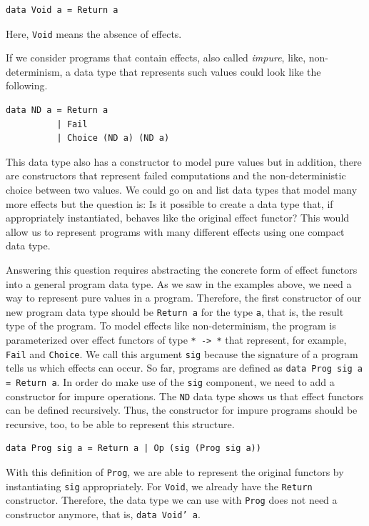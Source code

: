 \documentclass[a4paper, 11pt, fleqn, twoside]{scrreprt}
\newcommand{\hinl}[1]{\texttt{#1}}
\begin{document}
\begin{verbatim}
data Void a = Return a
\end{verbatim}

Here, \hinl{Void} means the absence of effects.

If we consider programs that contain effects, also called \textit{impure}, like, non-determinism, a data type that represents such values could look like the following.

\begin{verbatim}
data ND a = Return a
          | Fail
          | Choice (ND a) (ND a)
\end{verbatim}

This data type also has a constructor to model pure values but in addition, there are constructors that represent failed computations and the non-deterministic choice between two values.
We could go on and list data types that model many more effects but the question is: Is it possible to create a data type that, if appropriately instantiated, behaves like the original effect functor?
This would allow us to represent programs with many different effects using one compact data type.

Answering this question requires abstracting the concrete form of effect functors into a general program data type.
As we saw in the examples above, we need a way to represent pure values in a program.
Therefore, the first constructor of our new program data type should be \hinl{Return a} for the type \hinl{a}, that is, the result type of the program.
To model effects like non-determinism, the program is parameterized over effect functors of type \hinl{* -> *} that represent, for example, \hinl{Fail} and \hinl{Choice}.
We call this argument \hinl{sig} because the signature of a program tells us which effects can occur.
So far, programs are defined as \hinl{data Prog sig a = Return a}.
In order do make use of the \hinl{sig} component, we need to add a constructor for impure operations.
The \hinl{ND} data type shows us that effect functors can be defined recursively.
Thus, the constructor for impure programs should be recursive, too, to be able to represent this structure.

\begin{verbatim}
data Prog sig a = Return a | Op (sig (Prog sig a))
\end{verbatim}

With this definition of \hinl{Prog}, we are able to represent the original functors by instantiating \hinl{sig} appropriately.
For \hinl{Void}, we already have the \hinl{Return} constructor.
Therefore, the data type we can use with \hinl{Prog} does not need a constructor anymore, that is, \hinl{data Void' a}.
\end{document}
